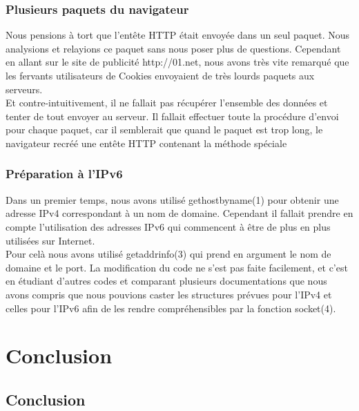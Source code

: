 \documentclass{scrreprt}
\begin{document}
\subsection{Plusieurs paquets du navigateur}
Nous pensions à tort que l'entête HTTP était envoyée dans un seul paquet. Nous analysions et relayions ce paquet sans nous poser plus de questions. Cependant en allant sur le site de publicité http://01.net, nous avons très vite remarqué que les fervants utilisateurs de Cookies envoyaient de très lourds paquets aux serveurs.\\
Et contre-intuitivement, il ne fallait pas récupérer l'ensemble des données et tenter de tout envoyer au serveur. Il fallait effectuer toute la procédure d'envoi pour chaque paquet, car il semblerait que quand le paquet est trop long, le navigateur recréé une entête HTTP contenant la méthode spéciale 

\subsection{Préparation à l'IPv6}
Dans un premier temps, nous avons utilisé gethostbyname(1) pour obtenir une adresse IPv4 correspondant à un nom de domaine. Cependant il fallait prendre en compte l'utilisation des adresses IPv6 qui commencent à être de plus en plus utilisées sur Internet.\\
Pour celà nous avons utilisé getaddrinfo(3) qui prend en argument le nom de domaine et le port. La modification du code ne s'est pas faite facilement, et c'est en étudiant d'autres codes et comparant plusieurs documentations que nous avons compris que nous pouvions caster les structures prévues pour l'IPv4 et celles pour l'IPv6 afin de les rendre compréhensibles par la fonction socket(4).

\chapter{Conclusion}

\section{Conclusion}
\end{document}
